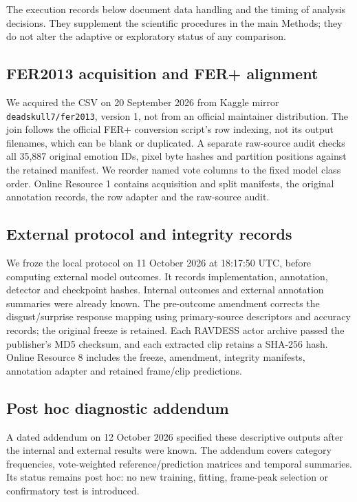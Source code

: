 The execution records below document data handling and the timing of analysis decisions. They supplement the scientific procedures in the main Methods; they do not alter the adaptive or exploratory status of any comparison.

\subsection*{FER2013 acquisition and FER+ alignment}
We acquired the CSV on 20 September 2026 from Kaggle mirror \texttt{deadskull7/fer2013}, version 1, not from an official maintainer distribution. The join follows the official FER+ conversion script's row indexing, not its output filenames, which can be blank or duplicated. A separate raw-source audit checks all 35,887 original emotion IDs, pixel byte hashes and partition positions against the retained manifest. We reorder named vote columns to the fixed model class order. Online Resource 1 contains acquisition and split manifests, the original annotation records, the row adapter and the raw-source audit.

\subsection*{External protocol and integrity records}
We froze the local protocol on 11 October 2026 at 18:17:50 UTC, before computing external model outcomes. It records implementation, annotation, detector and checkpoint hashes. Internal outcomes and external annotation summaries were already known. The pre-outcome amendment corrects the disgust/surprise response mapping using primary-source descriptors and accuracy records; the original freeze is retained. Each RAVDESS actor archive passed the publisher's MD5 checksum, and each extracted clip retains a SHA-256 hash. Online Resource 8 includes the freeze, amendment, integrity manifests, annotation adapter and retained frame/clip predictions.

\subsection*{Post hoc diagnostic addendum}
A dated addendum on 12 October 2026 specified these descriptive outputs after the internal and external results were known. The addendum covers category frequencies, vote-weighted reference/prediction matrices and temporal summaries. Its status remains post hoc: no new training, fitting, frame-peak selection or confirmatory test is introduced.


